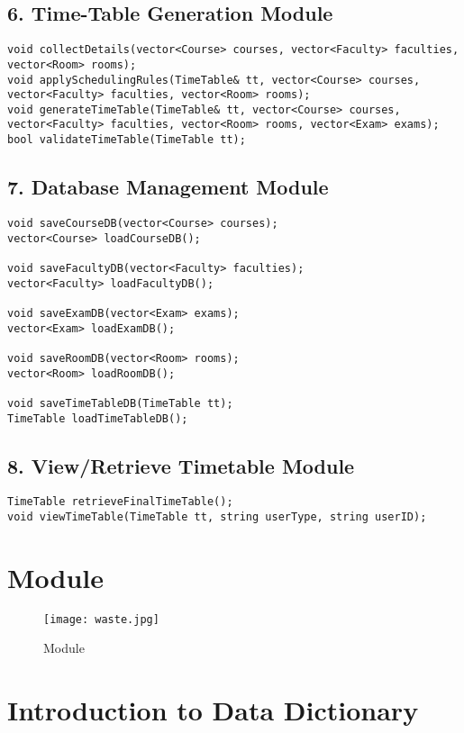 \documentclass[12pt]{article}
\begin{document}
\subsection*{6. Time-Table Generation Module}
\begin{lstlisting}[style=cppstyle]
void collectDetails(vector<Course> courses, vector<Faculty> faculties, vector<Room> rooms);
void applySchedulingRules(TimeTable& tt, vector<Course> courses, vector<Faculty> faculties, vector<Room> rooms);
void generateTimeTable(TimeTable& tt, vector<Course> courses, vector<Faculty> faculties, vector<Room> rooms, vector<Exam> exams);
bool validateTimeTable(TimeTable tt);
\end{lstlisting}

\subsection*{7. Database Management Module}
\begin{lstlisting}[style=cppstyle]
void saveCourseDB(vector<Course> courses);
vector<Course> loadCourseDB();

void saveFacultyDB(vector<Faculty> faculties);
vector<Faculty> loadFacultyDB();

void saveExamDB(vector<Exam> exams);
vector<Exam> loadExamDB();

void saveRoomDB(vector<Room> rooms);
vector<Room> loadRoomDB();

void saveTimeTableDB(TimeTable tt);
TimeTable loadTimeTableDB();
\end{lstlisting}

\subsection*{8. View/Retrieve Timetable Module}
\begin{lstlisting}[style=cppstyle]
TimeTable retrieveFinalTimeTable();
void viewTimeTable(TimeTable tt, string userType, string userID);
\end{lstlisting}
\newpage


\section{Module}
\begin{figure}[H]
    \centering
    \texttt{[image: waste.jpg]}
    \caption{Module}
    \label{fig:placeholder}
\end{figure}
 \section{Introduction to Data Dictionary}
\end{document}
